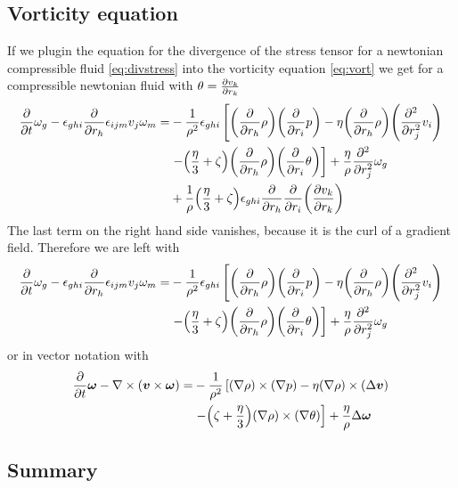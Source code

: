 \subsection{Vorticity equation}
If we plugin the equation for the divergence of the
stress tensor for a newtonian compressible fluid \eqref{eq:divstress} into
the vorticity equation \eqref{eq:vort} we get for a compressible newtonian
fluid with $\theta=\ppd{r_k}{v_k}$
\begin{align}
\begin{split}
\pd{t}\omega_g
-\epsilon_{ghi}\pd{r_h} \epsilon_{ijm} v_j \omega_m =
&-\frac{1}{\rho^2}\epsilon_{ghi}\left[
\lra{\pd{r_h}\rho} \lra{\pd{r_i}p}
-\eta \lra{\pd{r_h}\rho} \lra{\pdd{r_j}v_i}\right.\\
&\left.-\lra{\frac{\eta}{3}+\zeta} \lra{\pd{r_h}\rho} 
\lra{\pd{r_i}\theta} \right]
+\frac{\eta}{\rho}\pdd{r_j}\omega_g \\
&+\frac{1}{\rho}\lra{\frac{\eta}{3}
+\zeta}\epsilon_{ghi}\pd{r_h}\pd{r_i}\lra{\ppd{r_k}{v_k}}
\end{split}
\end{align}
The last term on the right hand side vanishes, because it is the curl
of a gradient field. Therefore we are left with
\begin{align}
\begin{split}
\pd{t}\omega_g
-\epsilon_{ghi}\pd{r_h} \epsilon_{ijm} v_j \omega_m =
&-\frac{1}{\rho^2}\epsilon_{ghi}\left[
\lra{\pd{r_h}\rho} \lra{\pd{r_i}p}
-\eta \lra{\pd{r_h}\rho} \lra{\pdd{r_j}v_i}\right.\\
&\left.-\lra{\frac{\eta}{3}+\zeta} \lra{\pd{r_h}\rho} 
\lra{\pd{r_i}\theta} \right]
+\frac{\eta}{\rho}\pdd{r_j}\omega_g
\end{split}
\end{align}
or in vector notation with 
\begin{align}
\begin{split}
\pd{t} \vec{\omega}-\nabla \times (\vec{v} \times \vec{\omega}) = 
&-\frac{1}{\rho^2}\left[
(\nabla \rho) \times(\nabla p)
- \eta (\nabla \rho) \times (\Delta \vec{v})\right.\\
&\left.- \lra{\zeta +\frac{\eta}{3}} (\nabla \rho) \times (\nabla
\theta)\right]
+\frac{\eta}{\rho} \Delta \vec{\omega}
\end{split}
\end{align}

\subsection{Summary}
